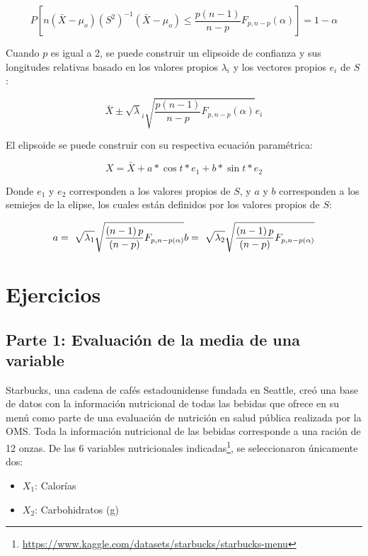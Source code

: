 \documentclass[
]{article}
\begin{document}
\[
P\left\lbrack n\left(\bar{X} -\mu_o \right){\left(S^2 \right)}^{-1} \left(\bar{X} -\mu_o \right)\le \frac{p\left(n-1\right)}{n-p}F_{p,n-p} \left(\alpha \right)\right\rbrack =1-\alpha
\]

Cuando \(p\) es igual a 2, se puede construir un elipsoide de confianza
y sus longitudes relativas basado en los valores propios \(\lambda_i\) y
los vectores propios \(e_i\) de \(S\):

\[
\bar{X} \pm {\sqrt{\lambda }}_i \sqrt{\frac{p\left(n-1\right)}{n-p}F_{p,n-p} \left(\alpha \right)}e_i
\]

El elipsoide se puede construir con su respectiva ecuación paramétrica:

\[
X=\bar{X}+a*\cos{t}*e_1+b*\sin{t}*e_2
\]

Donde \(e_1\) y \(e_2\) corresponden a los valores propios de \(S\), y
\(a\) y \(b\) corresponden a los semiejes de la elipse, los cuales están
definidos por los valores propios de \(S\):

\[
a=\ \sqrt{\lambda_1}\sqrt{\frac{\left(n-1\right)p}{\left(n-p\right)}F_{p,n-p\left(\alpha\right)}} \\
b=\ \sqrt{\lambda_2}\sqrt{\frac{\left(n-1\right)p}{\left(n-p\right)}F_{p,n-p\left(\alpha\right)}}
\]

\section{Ejercicios}\label{ejercicios}

\subsection{Parte 1: Evaluación de la media de una
variable}\label{parte-1-evaluaciuxf3n-de-la-media-de-una-variable}

Starbucks, una cadena de cafés estadounidense fundada en Seattle, creó
una base de datos con la información nutricional de todas las bebidas
que ofrece en su menú como parte de una evaluación de nutrición en salud
pública realizada por la OMS. Toda la información nutricional de las
bebidas corresponde a una ración de 12 onzas. De las 6 variables
nutricionales indicadas\footnote{\url{https://www.kaggle.com/datasets/starbucks/starbucks-menu}},
se seleccionaron únicamente dos:

\begin{itemize}
\item
  \(X_1\): Calorías
\item
  \(X_2\): Carbohidratos (g)
\end{itemize}
\end{document}

